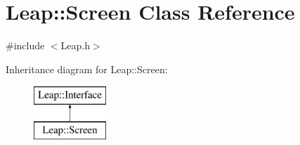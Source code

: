 \hypertarget{class_leap_1_1_screen}{\section{Leap\+:\+:Screen Class Reference}
\label{class_leap_1_1_screen}
}


{\ttfamily \#include $<$Leap.\+h$>$}

Inheritance diagram for Leap\+:\+:Screen\+:\begin{figure}[H]
\begin{center}
\leavevmode
\includegraphics[height=2.000000cm]{class_leap_1_1_screen}
\end{center}
\end{figure}
